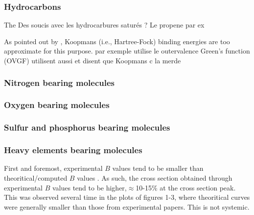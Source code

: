 \documentclass[twocolumn, a4paper, twoside,10pt]{scrartcl}
\begin{document}
\subsubsection*{Hydrocarbons}
The 
Des soucis avec les hydrocarbures saturés ? Le propene par ex

As pointed out by \citet{scottElectronImpactIonizationCross2005},  Koopmans (i.e., Hartree-Fock) binding energies are too approximate for this purpose. par exemple utilise le outervalence Green’s function (OVGF) \citet{wangGeometryOptimizationMade2016} utilisent aussi et disent que Koopmans c la merde

\subsubsection*{Nitrogen bearing molecules}

\subsubsection*{Oxygen bearing molecules}

\subsubsection*{Sulfur and phosphorus bearing molecules}

\subsubsection*{Heavy elements bearing molecules}


First and foremost, experimental $B$ values tend to be smaller than theoritical/computed $B$ values \citep{aliElectronimpactTotalIonization1997,hwangNewModelElectronimpact1996}. As such, the cross section obtained through experimental $B$ values tend to be higher,$ \approx$10-15\% at the cross section peak. This was observed several time in the plots of figures 1-3, where theoritical curves were generally smaller than those from experimental papers. This is not systemic.\\
\end{document}
